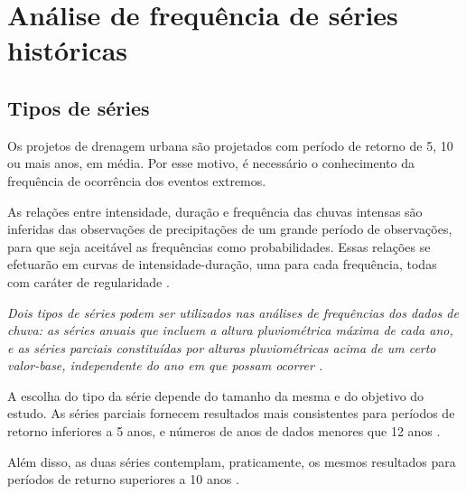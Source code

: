 \section{Análise de frequência de séries históricas}

\subsection{Tipos de séries}

Os projetos de drenagem urbana são projetados com período de retorno de 5, 10 ou mais anos, em média. Por esse motivo, é necessário o conhecimento da frequência de ocorrência dos eventos extremos.

As relações entre intensidade, duração e frequência das chuvas intensas são inferidas das observações de precipitações de um grande período de observações, para que seja aceitável as frequências como probabilidades. Essas relações se efetuarão em curvas de intensidade-duração, uma para cada frequência, todas com caráter de regularidade \cite{drenagem-superficial}.

\textit{Dois tipos de séries podem ser utilizados nas análises de frequências dos dados de chuva: as séries anuais que incluem a altura pluviométrica máxima de cada ano, e as séries parciais constituídas por alturas pluviométricas acima de um certo valor-base, independente do ano em que possam ocorrer \cite{drenagem-superficial}.}

A escolha do tipo da série depende do tamanho da mesma e do objetivo do estudo. As séries parciais fornecem resultados mais consistentes para períodos de retorno inferiores a 5 anos, e números de anos de dados menores que 12 anos \cite{tucci1993}.

Além disso, as duas séries contemplam, praticamente, os mesmos resultados para períodos de returno superiores a 10 anos \cite{manual-daee}.